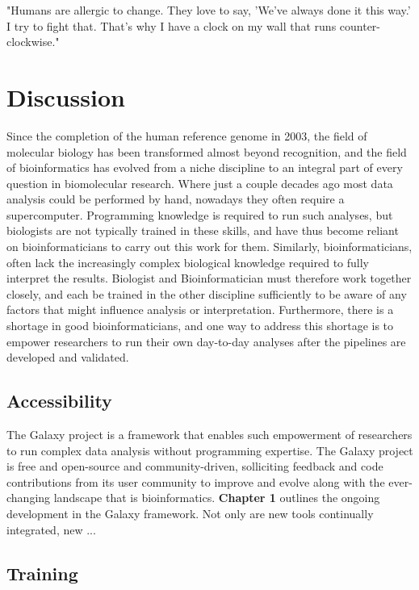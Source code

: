 \begin{savequote}[75mm]
"Humans are allergic to change. They love to say, 'We've always done it this way.' I try to fight that. That's why I have a clock on my wall that runs counter-clockwise."
\end{savequote}

\chapter{Discussion}
\label{discussion}
\setcounter{figure}{-1}
\setcounter{table}{-1}
\setcounter{section}{-1}
\setcounter{NAT@ctr}{-1}

Since the completion of the human reference genome in 2003, the field of molecular biology has been transformed almost beyond recognition, and the field of bioinformatics has evolved from a niche discipline to an integral part of every question in biomolecular research. Where just a couple decades ago most data analysis could be performed by hand, nowadays they often require a supercomputer. Programming knowledge is required to run such analyses, but biologists are not typically trained in these skills, and have thus become reliant on bioinformaticians to carry out this work for them. Similarly, bioinformaticians, often lack the increasingly complex biological knowledge required to fully interpret the results. Biologist and Bioinformatician must therefore work together closely, and each be trained in the other discipline sufficiently to be aware of any factors that might influence analysis or interpretation. Furthermore, there is a shortage in good bioinformaticians, and one way to address this shortage is to empower researchers to run their own day-to-day analyses after the pipelines are developed and validated.


\section{Accessibility}
The Galaxy project \cite{} is a framework that enables such empowerment of researchers to run complex data analysis without programming expertise. The Galaxy project is free and open-source and community-driven, solliciting feedback and code contributions from its user community to improve and evolve along with the ever-changing landscape that is bioinformatics. \textbf{Chapter 1} outlines the ongoing development in the Galaxy framework. Not only are new tools continually integrated, new ...


\section{Training}



